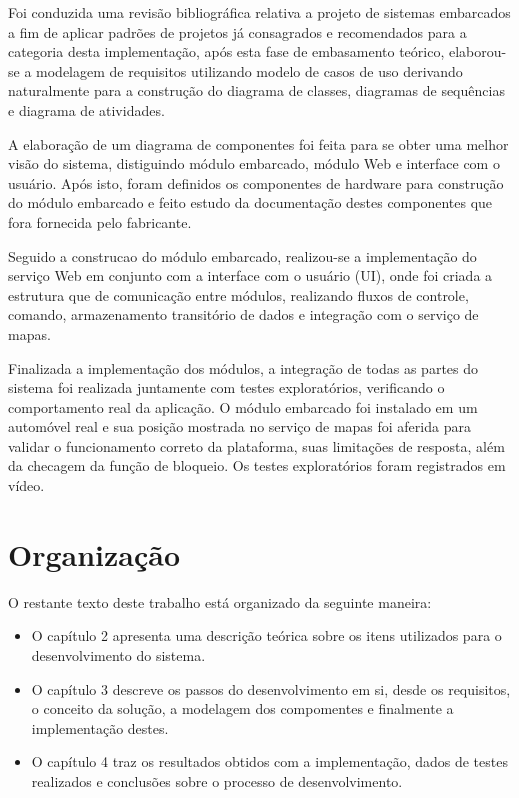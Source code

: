 Foi conduzida uma revisão bibliográfica relativa a projeto de sistemas
embarcados a fim de aplicar padrões de projetos já consagrados e recomendados para a categoria desta implementação, após esta fase de embasamento teórico, elaborou-se a modelagem de requisitos utilizando modelo de casos de uso derivando naturalmente para a construção do diagrama de classes, diagramas de sequências e diagrama de atividades.

A elaboração de um diagrama de componentes foi feita para se obter uma melhor visão do sistema, distiguindo módulo embarcado, módulo Web e interface 
com o usuário. Após isto, foram definidos os componentes de hardware
para construção do módulo embarcado e feito estudo da documentação destes componentes que fora fornecida pelo fabricante. 

Seguido a construcao do módulo embarcado, realizou-se a implementação do serviço Web em conjunto com a interface com o usuário (UI), onde foi criada a estrutura que de comunicação entre módulos, realizando fluxos de controle, comando, armazenamento transitório de dados e integração com o serviço de mapas.  

Finalizada a implementação dos módulos, a integração de todas as partes do sistema foi realizada juntamente com testes exploratórios, verificando o comportamento real da aplicação. O módulo embarcado foi instalado em um automóvel real e sua posição mostrada no serviço de mapas foi aferida para validar o funcionamento correto da plataforma, suas limitações de resposta, além da checagem da função de bloqueio. Os testes exploratórios foram registrados em vídeo.

\section{Organiza\c{c}\~{a}o}

O restante texto deste trabalho está organizado da seguinte maneira:

\begin{itemize}
	\item O capítulo 2 apresenta uma descrição teórica sobre os itens utilizados para o desenvolvimento do sistema.
	\item O capítulo 3 descreve os passos do desenvolvimento em si, desde os requisitos, o conceito da solução, a modelagem dos compomentes e finalmente a implementação destes.
	\item O capítulo 4 traz os resultados obtidos com a implementação, dados de testes realizados e conclusões sobre o processo de desenvolvimento.
\end{itemize}